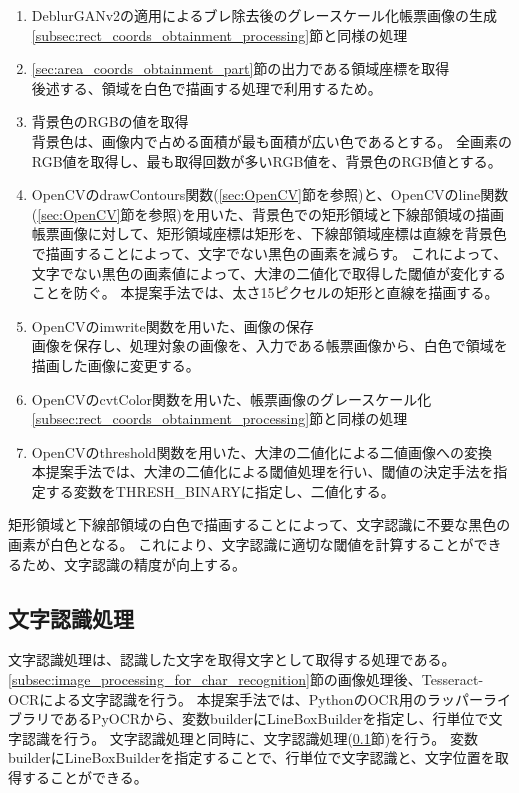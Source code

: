 \begin{enumerate}
    \item DeblurGANv2の適用によるブレ除去後のグレースケール化帳票画像の生成\\
        \ref{subsec:rect_coords_obtainment_processing}節と同様の処理
    \item \ref{sec:area_coords_obtainment_part}節の出力である領域座標を取得\\
        後述する、領域を白色で描画する処理で利用するため。
    \item 背景色のRGBの値を取得\\
        背景色は、画像内で占める面積が最も面積が広い色であるとする。
        全画素のRGB値を取得し、最も取得回数が多いRGB値を、背景色のRGB値とする。
    \item OpenCVのdrawContours関数(\ref{sec:OpenCV}節を参照)と、OpenCVのline関数(\ref{sec:OpenCV}節を参照)を用いた、背景色での矩形領域と下線部領域の描画\\
        帳票画像に対して、矩形領域座標は矩形を、下線部領域座標は直線を背景色で描画することによって、文字でない黒色の画素を減らす。
        これによって、文字でない黒色の画素値によって、大津の二値化で取得した閾値が変化することを防ぐ。
        本提案手法では、太さ15ピクセルの矩形と直線を描画する。
    \item OpenCVのimwrite関数を用いた、画像の保存\\
        画像を保存し、処理対象の画像を、入力である帳票画像から、白色で領域を描画した画像に変更する。
    \item OpenCVのcvtColor関数を用いた、帳票画像のグレースケール化\\
        \ref{subsec:rect_coords_obtainment_processing}節と同様の処理
    \item OpenCVのthreshold関数を用いた、大津の二値化による二値画像への変換\\
        本提案手法では、大津の二値化による閾値処理を行い、閾値の決定手法を指定する変数をTHRESH\_BINARYに指定し、二値化する。
\end{enumerate}

矩形領域と下線部領域の白色で描画することによって、文字認識に不要な黒色の画素が白色となる。
これにより、文字認識に適切な閾値を計算することができるため、文字認識の精度が向上する。

\subsection{文字認識処理}\label{subsec:char_recognition_processing}
文字認識処理は、認識した文字を取得文字として取得する処理である。
\ref{subsec:image_processing_for_char_recognition}節の画像処理後、Tesseract-OCRによる文字認識を行う。
本提案手法では、PythonのOCR用のラッパーライブラリであるPyOCRから、変数builderにLineBoxBuilderを指定し、行単位で文字認識を行う。
文字認識処理と同時に、文字認識処理(\ref{subsec:char_recognition_processing}節)を行う。
変数builderにLineBoxBuilderを指定することで、行単位で文字認識と、文字位置を取得することができる。

